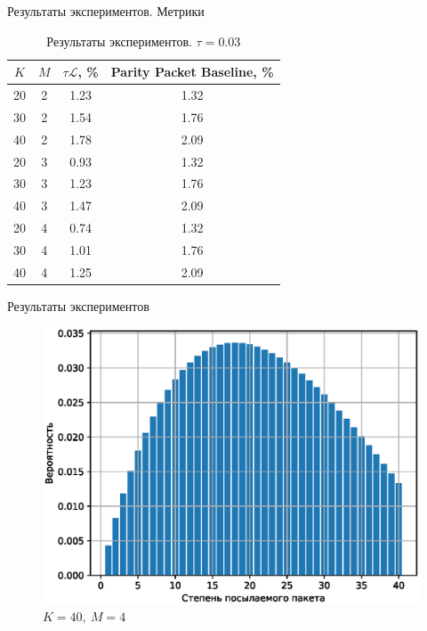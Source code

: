 \documentclass{beamer}
\begin{document}
\begin{frame}{Результаты экспериментов. Метрики}
    \begin{table}[h!]
\begin{center}
    \begin{tabular}{|c|c|c|c|}
        \hline
        $K$ & $M$ & $\tau\mathcal L$, \% & Parity Packet Baseline, \% \\
        \hline
        20 & 2 & 1.23 & 1.32 \\
        \hline
        30 & 2 & 1.54 & 1.76 \\
        \hline
        40 & 2 & 1.78 & 2.09 \\
        \hline 
        20 & 3 & 0.93 & 1.32 \\
        \hline
        30 & 3 & 1.23 & 1.76 \\
        \hline
        40 & 3 & 1.47 & 2.09 \\ 
        \hline
        20 & 4 & 0.74 & 1.32 \\
        \hline 
        30 & 4 & 1.01 & 1.76 \\
        \hline
        40 & 4 & 1.25 & 2.09\\
        \hline
    \end{tabular}
\caption{Результаты экспериментов. $\tau=0.03$}
\end{center}
\end{table}
\end{frame}

\begin{frame}{Результаты экспериментов}
    \begin{figure}
    \centering
    \includegraphics[scale=0.5]{img/distr2.eps}
    \caption{$K=40, \: M=4$}
    \end{figure}
\end{frame}
\end{document}
